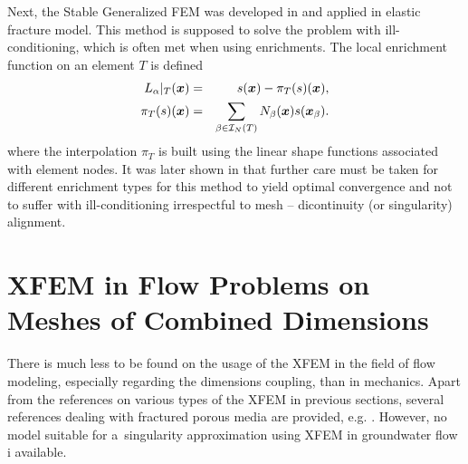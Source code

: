 Next, the Stable Generalized FEM was developed in \cite{babuska_stable_2012, gupta_stable_2013}
and applied in elastic fracture model. This method is supposed to solve the problem with ill-conditioning,
which is often met when using enrichments. The local enrichment function on an element $T$ is defined
\begin{eqnarray} 
    L_{\alpha}|_{T}(\mathbf{\boldsymbol{x}}) &=& s(\mathbf{\boldsymbol{x}}) - \pi_T (s)(\mathbf{\boldsymbol{x}}), \label{eqn:sgfem_enrich} \\
    \pi_T (s)(\mathbf{\boldsymbol{x}}) &=& \sum_{\beta\in\mathcal{I}_N(T)} N_\beta(\mathbf{\boldsymbol{x}}) s(\mathbf{\boldsymbol{x}}_\beta).
\end{eqnarray} 
where the interpolation $\pi_T$ is built using the linear shape functions
associated with element nodes. It was later shown in \cite{zhang_robust_2016} that
further care must be taken for different enrichment types for this method to
yield optimal convergence and not to suffer with ill-conditioning irrespectful to mesh -- dicontinuity (or singularity) alignment.


\section{XFEM in Flow Problems on Meshes of Combined Dimensions} \label{sec:soa_xfem_combined}
There is much less to be found on the usage of the XFEM in the field of flow modeling, especially regarding the dimensions coupling,
than in mechanics. Apart from the references on various types of the XFEM in previous sections,
several references dealing with fractured porous media are provided, e.g. \cite{fumagalli_numerical_2012, schwenck_2015}.
However, no model suitable for a~singularity approximation using XFEM in groundwater flow i available.
